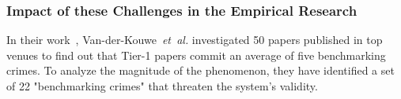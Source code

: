 
\subsubsection{Impact of these Challenges in the Empirical Research}
In their work~\cite{van_der_kouwe_benchmarking_2018}, Van-der-Kouwe~\emph{et~al.} investigated 50 papers published in top venues
to find out that Tier-1 papers commit an average of five benchmarking crimes.
To analyze the magnitude of the phenomenon, they have identified a set of 22 "benchmarking crimes" that threaten the system's validity.

